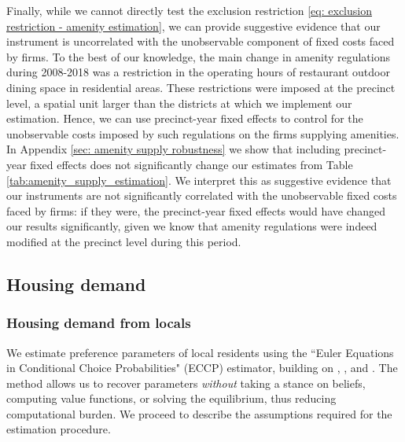 \documentclass[11pt]{article}
\begin{document}
Finally, while we cannot directly test the exclusion restriction \ref{eq: exclusion restriction - amenity estimation}, we can provide suggestive evidence that our instrument is uncorrelated with the unobservable component of fixed costs faced by firms. To the best of our knowledge, the main change in amenity regulations during 2008-2018 was a restriction in the operating hours of restaurant outdoor dining space in residential areas. These restrictions were imposed at the precinct level, a spatial unit larger than the districts at which we implement our estimation. Hence, we can use precinct-year fixed effects to control for the unobservable costs imposed by such regulations on the firms supplying amenities. In Appendix \ref{sec: amenity supply robustness} we show that including precinct-year fixed effects does not significantly change our estimates from Table \ref{tab:amenity_supply_estimation}. We interpret this as suggestive evidence that our instruments are not significantly correlated with the unobservable fixed costs faced by firms: if they were, the precinct-year fixed effects would have changed our results significantly, given we know that amenity regulations were indeed modified at the precinct level during this period. 

\subsection{Housing demand}\label{sec:demand_estimation}

\subsubsection{Housing demand from locals}\label{sec:demand_estimation_locals}

We estimate preference parameters of local residents using the ``Euler Equations in Conditional Choice Probabilities" (ECCP) estimator, building on \cite{aguirregabiria2010dynamic}, \cite{scott2013dynamic}, and \cite{kalouptsidi2021linear}. The method allows us to recover parameters \textit{without} taking a stance on beliefs, computing value functions, or solving the equilibrium, thus reducing computational burden. We proceed to describe the assumptions required for the estimation procedure.
\end{document}
